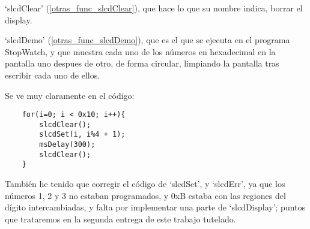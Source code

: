 \documentclass[a4paper,openright,12pt]{article}
\begin{document}
`slcdClear' (\ref{otras_func_slcdClear}), que hace lo que su nombre indica, borrar el display.

`slcdDemo' (\ref{otras_func_slcdDemo}), que es el que se ejecuta en el programa StopWatch, y que muestra cada uno de los números en hexadecimal en la pantalla uno
despues de otro, de forma circular, limpiando la pantalla tras escribir cada uno de ellos.

Se ve muy claramente en el código:
\begin{verbatim}
    for(i=0; i < 0x10; i++){
        slcdClear();
        slcdSet(i, i%4 + 1);
        msDelay(300);
        slcdClear();
    }   
\end{verbatim}

También he tenido que corregir el código de `slcdSet', y `slcdErr', ya que los números 1, 2 y 3 no estaban programados,
y 0xB estaba con las regiones del dígito intercambiadas, y falta por implementar una parte de `slcdDisplay'; puntos que trataremos en la
segunda entrega de este trabajo tutelado.


\printbibliography[]{}
\end{document}
